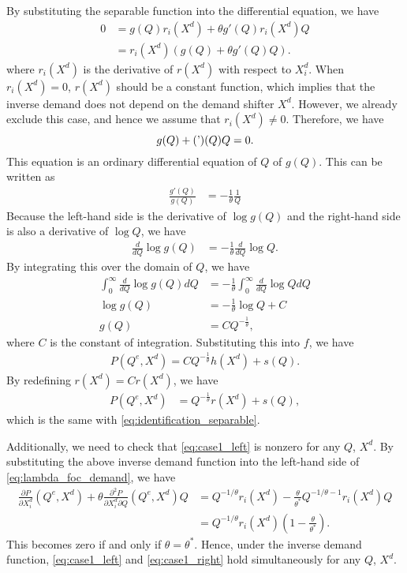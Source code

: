 \documentclass[11pt, a4paper]{article}
\theoremstyle{remark}
\begin{document}
By substituting the separable function into the differential equation, we have 
\begin{align}
   0 & =  g(Q) r_i(X^{d}) + \theta g'(Q)r_i(X^{d}) Q\\
   & = r_i(X^{d})( g(Q) + \theta g'(Q)Q).
\end{align}
where $r_i(X^{d})$ is the derivative of $r(X^{d})$ with respect to $X^{d}_i$.
When $r_i(X^{d}) = 0$, $r(X^{d})$ should be a constant function, which implies that the inverse demand does not depend on the demand shifter $X^{d}$.
However, we already exclude this case, and hence we assume that $r_i(X^{d}) \ne 0$.
Therefore, we have 
\[g(Q) + \thetag'(Q)Q = 0.\]
This equation is an ordinary differential equation of $Q$ of $g(Q)$.
This can be written as
\begin{align}
    \frac{g'(Q)}{g(Q)} &= -\frac{1}{\theta} \frac{1}{Q}
\end{align}
Because the left-hand side is the derivative of $\log g(Q)$ and the right-hand side is also a derivative of $\log Q$, we have
\begin{align}
        \frac{d}{dQ} \log g(Q) &= -\frac{1}{\theta} \frac{d}{dQ} \log Q.
\end{align}
By integrating this over the domain of $Q$, we have
\begin{align}
    \int_{0}^\infty \frac{d}{dQ} \log g(Q) dQ &= -\frac{1}{\theta} \int_{0}^\infty  \frac{d}{dQ} \log Q dQ \\
    \log g(Q) &= -\frac{1}{\theta} \log Q + C\\
    g(Q) &= C Q^{-\frac{1}{\theta}},
\end{align}
where $C$ is the constant of integration.
Substituting this into $f$, we have 
\begin{align}
    P(Q^e, X^{d}) = C Q^{-\frac{1}{\theta}} h(X^{d}) + s(Q).
\end{align}
By redefining $r(X^{d}) = Cr(X^{d})$, we have
\begin{align}
    P(Q^e, X^{d}) &= Q^{-\frac{1}{\theta}} r(X^{d}) + s(Q),
\end{align}
which is the same with \eqref{eq:identification_separable}.

Additionally, we need to check that \eqref{eq:case1_left} is nonzero for any $Q$, $X^{d}$.
By substituting the above inverse demand function into the left-hand side of \eqref{eq:lambda_foc_demand}, we have
\begin{align}
    \frac{\partial P}{\partial X^{d}_{i}}(Q^e, X^{d}) + \theta\frac{\partial^2 P}{\partial X^{d}_{i}\partial Q}(Q^e, X^{d})Q  &= Q^{-1/\theta} r_i(X^d) - \frac{\theta}{\theta^{*}} Q^{-1/\theta-1} r_i(X^d) Q\\
    &= Q^{-1/\theta} r_i(X^d) \left(1 - \frac{\theta}{\theta^{*}} \right).
\end{align}
This becomes zero if and only if $\theta= \theta^{*}$.
Hence, under the inverse demand function, \eqref{eq:case1_left} and \eqref{eq:case1_right} hold simultaneously for any $Q$, $X^{d}$.
\end{document}
